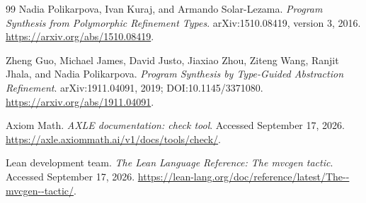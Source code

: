 \begin{thebibliography}{99}
 Nadia Polikarpova, Ivan Kuraj, and Armando Solar-Lezama.
\emph{Program Synthesis from Polymorphic Refinement Types}.
arXiv:1510.08419, version 3, 2016.
\url{https://arxiv.org/abs/1510.08419}.

 Zheng Guo, Michael James, David Justo, Jiaxiao Zhou, Ziteng Wang,
Ranjit Jhala, and Nadia Polikarpova.
\emph{Program Synthesis by Type-Guided Abstraction Refinement}.
arXiv:1911.04091, 2019; DOI:10.1145/3371080.
\url{https://arxiv.org/abs/1911.04091}.

 Axiom Math.
\emph{AXLE documentation: check tool}.
Accessed September 17, 2026.
\url{https://axle.axiommath.ai/v1/docs/tools/check/}.

 Lean development team.
\emph{The Lean Language Reference: The mvcgen tactic}.
Accessed September 17, 2026.
\url{https://lean-lang.org/doc/reference/latest/The--mvcgen--tactic/}.
\end{thebibliography}
